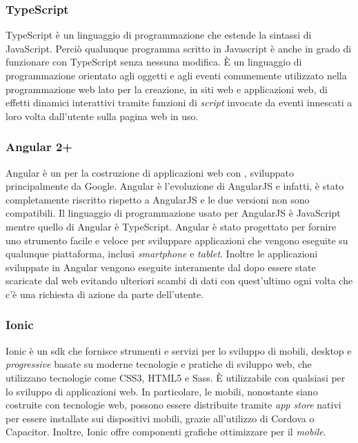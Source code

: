 \subsubsection*{TypeScript}
TypeScript è un linguaggio di programmazione  che estende la sintassi di JavaScript. Perciò qualunque programma scritto in Javascript è anche in grado di funzionare con TypeScript senza nessuna modifica. È un linguaggio di programmazione orientato agli oggetti e agli eventi comunemente utilizzato nella programmazione web lato  per la creazione, in siti web e applicazioni web, di effetti dinamici interattivi tramite funzioni di \emph{script} invocate da eventi innescati a loro volta dall'utente sulla pagina web in uso.

\subsubsection*{Angular 2+}
Angular è un   per la costruzione di applicazioni web con , sviluppato principalmente da Google. Angular è l'evoluzione di AngularJS e infatti, è stato completamente riscritto rispetto a AngularJS e le due versioni non sono compatibili. Il linguaggio di programmazione usato per AngularJS è JavaScript mentre quello di Angular è TypeScript. Angular è stato progettato per fornire uno strumento facile e veloce per sviluppare applicazioni che vengono eseguite su qualunque piattaforma, inclusi \emph{smartphone} e \emph{tablet}. Inoltre le applicazioni sviluppate in Angular vengono eseguite interamente dal  dopo essere state scaricate dal web  evitando ulteriori scambi di dati con quest'ultimo ogni volta che c'è una richiesta di azione da parte dell'utente. 

\subsubsection*{Ionic}
Ionic è un \gls{sdk}  che fornisce strumenti e servizi per lo sviluppo di \textcolor{SchoolColor}{\ap{[g]}} mobili, desktop e \emph{progressive} basate su moderne tecnologie e pratiche di sviluppo web, che utilizzano tecnologie come \gls{CSS}3, \gls{HTML}5 e \gls{Sass}. È utilizzabile con qualsiasi  per lo sviluppo di applicazioni web. In particolare, le \textcolor{SchoolColor}{\ap{[g]}} mobili, nonostante siano costruite con tecnologie web, possono essere distribuite tramite \emph{app store} nativi per essere installate sui dispositivi mobili, grazie all'utilizzo di  Cordova o Capacitor. Inoltre, Ionic offre componenti grafiche ottimizzare per il \emph{mobile}.

